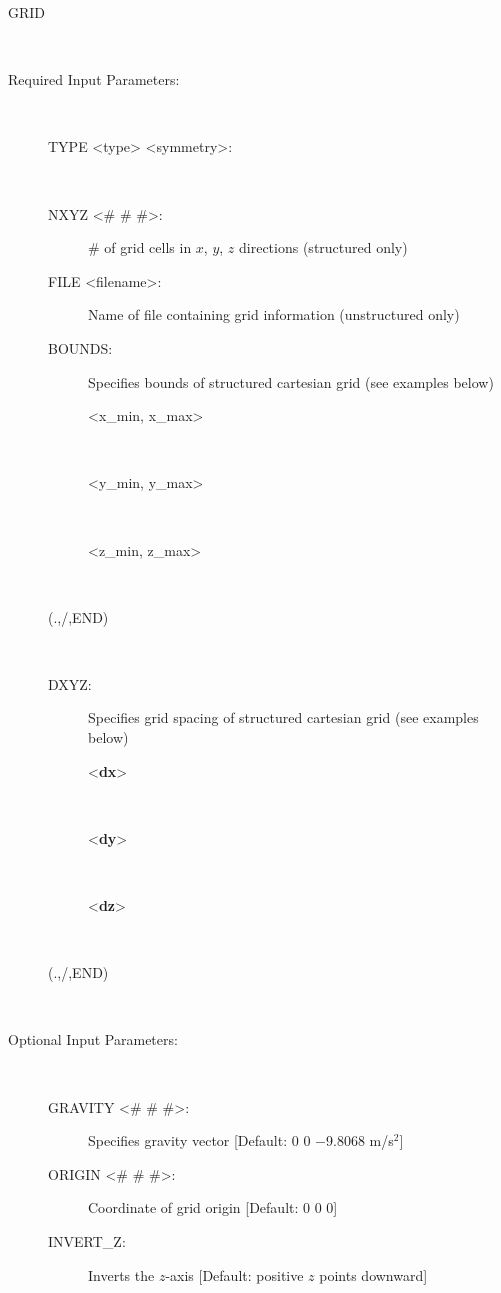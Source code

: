 \documentclass[12pt]{article}
\begin{document}
\begin{description}
\item[GRID]~
\item[Required Input Parameters:]~

\begin{description}
\item[TYPE <type> <symmetry>:] ~


\item[NXYZ <\# \# \#>:] \# of grid cells in $x$, $y$, $z$ directions (structured only)

\item[FILE <filename>:] Name of file containing grid information (unstructured only)

\item[BOUNDS:] Specifies bounds of structured cartesian grid (see examples below)
\begin{description}
\item[<x\_min, x\_max>]~
\item[<y\_min, y\_max>]~
\item[<z\_min, z\_max>]~
\end{description}
\item[(.,/,END)] ~

\item[DXYZ:] Specifies grid spacing of structured cartesian grid (see examples below)
\begin{description}
\item[<{\bf dx}>] ~
\item[<{\bf dy}>] ~
\item[<{\bf dz}>] ~
\end{description}
\item[(.,/,END)] ~
\end{description}

\item[Optional Input Parameters:] ~

\begin{description}

\item[GRAVITY <\# \# \#>:] Specifies gravity vector [Default: 0 0 $-$9.8068 m/s$^2$]

\item[ORIGIN <\# \# \#>:] Coordinate of grid origin [Default: 0 0 0]

\item[INVERT\_Z:] Inverts the $z$-axis [Default: positive $z$ points downward]
\end{description}
\end{description}
\end{document}
